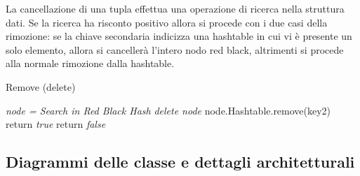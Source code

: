 \indent La cancellazione di una tupla effettua una operazione di ricerca nella struttura dati.
Se la ricerca ha risconto positivo allora si procede con i due casi della rimozione:
se la chiave secondaria indicizza una hashtable in cui vi \`e presente un solo elemento, allora
si canceller\`a l'intero nodo red black, altrimenti si procede alla normale rimozione dalla hashtable.
\BlankLine
\IncMargin{1.5em}
\begin{algorithm}[H]
\caption{Remove (delete)}
\emph{node = Search in Red Black Hash}\;
 {
     {
    \emph{delete node}\;}
    {node.Hashtable.remove(key2)\;}
    return \emph{true}\;}
return \emph{false}\;
\end{algorithm}\newpage

\subsection{Diagrammi delle classe e dettagli architetturali}

